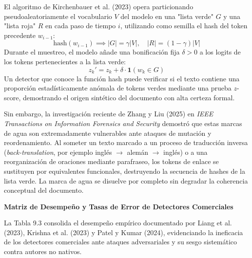El algoritmo de Kirchenbauer et al. (2023) opera particionando pseudoaleatoriamente el vocabulario $V$ del modelo en una "lista verde" $G$ y una "lista roja" $R$ en cada paso de tiempo $i$, utilizando como semilla el hash del token precedente $w_{i-1}$:
\begin{equation}
\text{hash}(w_{i-1}) \implies |G| = \gamma |V|, \quad |R| = (1-\gamma)|V|
\end{equation}
Durante el muestreo, el modelo añade una bonificación fija $\delta > 0$ a los logits de los tokens pertenecientes a la lista verde:
\begin{equation}
z_k' = z_k + \delta \cdot \mathbf{1}(w_k \in G)
\end{equation}
Un detector que conoce la función hash puede verificar si el texto contiene una proporción estadísticamente anómala de tokens verdes mediante una prueba $z$-score, demostrando el origen sintético del documento con alta certeza formal.

Sin embargo, la investigación reciente de Zhang y Liu (2025) en \textit{IEEE Transactions on Information Forensics and Security} demostró que estas marcas de agua son extremadamente vulnerables ante ataques de mutación y reordenamiento. Al someter un texto marcado a un proceso de traducción inversa (\textit{back-translation}, por ejemplo inglés $\to$ alemán $\to$ inglés) o a una reorganización de oraciones mediante parafraseo, los tokens de enlace se sustituyen por equivalentes funcionales, destruyendo la secuencia de hashes de la lista verde. La marca de agua se disuelve por completo sin degradar la coherencia conceptual del documento.

\vspace{0.4cm}
\textbf{Matriz de Desempeño y Tasas de Error de Detectores Comerciales}

La Tabla 9.3 consolida el desempeño empírico documentado por Liang et al. (2023), Krishna et al. (2023) y Patel y Kumar (2024), evidenciando la ineficacia de los detectores comerciales ante ataques adversariales y su sesgo sistemático contra autores no nativos.

